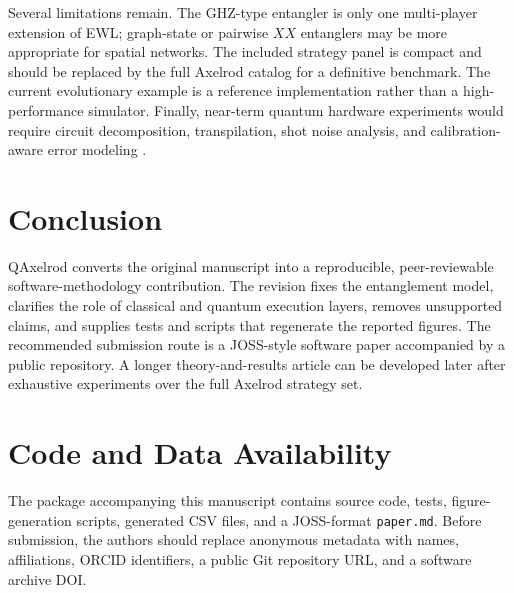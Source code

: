 \documentclass[11pt]{article}
\begin{document}
Several limitations remain. The GHZ-type entangler is only one multi-player extension of EWL; graph-state or pairwise $XX$ entanglers may be more appropriate for spatial networks. The included strategy panel is compact and should be replaced by the full Axelrod catalog for a definitive benchmark. The current evolutionary example is a reference implementation rather than a high-performance simulator. Finally, near-term quantum hardware experiments would require circuit decomposition, transpilation, shot noise analysis, and calibration-aware error modeling \cite{Benjamin2001,Du2002}.

\section{Conclusion}
QAxelrod converts the original manuscript into a reproducible, peer-reviewable software-methodology contribution. The revision fixes the entanglement model, clarifies the role of classical and quantum execution layers, removes unsupported claims, and supplies tests and scripts that regenerate the reported figures. The recommended submission route is a JOSS-style software paper accompanied by a public repository. A longer theory-and-results article can be developed later after exhaustive experiments over the full Axelrod strategy set.

\section*{Code and Data Availability}
The package accompanying this manuscript contains source code, tests, figure-generation scripts, generated CSV files, and a JOSS-format \texttt{paper.md}. Before submission, the authors should replace anonymous metadata with names, affiliations, ORCID identifiers, a public Git repository URL, and a software archive DOI.



\end{document}
